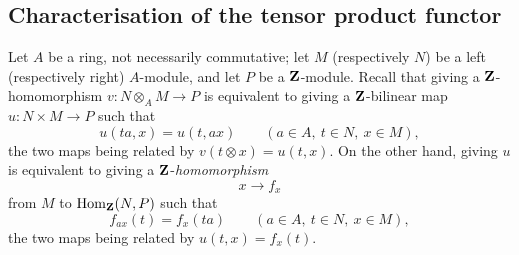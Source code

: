 \subsection{Characterisation of the tensor product functor}
\label{subsection:III.7.2}

\begin{env}[7.2.1]
\label{III.7.2.1}
Let $A$ be a ring, not necessarily commutative; let $M$
(respectively $N$) be a left (respectively right) $A$-module,
and let $P$ be a $\mathbf{Z}$-module.  Recall that giving a
$\mathbf{Z}$-homomorphism $v:N\otimes_A M\longrightarrow P$
is equivalent to giving a $\mathbf{Z}$-bilinear map $u:N\times M\longrightarrow P$
such that
\[
  u(ta,x)=u(t,ax)
  \qquad(a\in A,\ t\in N,\ x\in M),
\]
the two maps being related by $v(t\otimes x)=u(t,x)$.
On the other hand, giving $u$ is equivalent to giving a
$\mathbf{Z}$-\emph{homomorphism}
\[
  x\to f_x
\]
from $M$ to $\operatorname{Hom}_{\mathbf{Z}}(N,P)$ such that
\[
  f_{ax}(t)=f_x(ta)
  \qquad(a\in A,\ t\in N,\ x\in M),
\]
the two maps being related by $u(t,x)=f_x(t)$.
\end{env}

